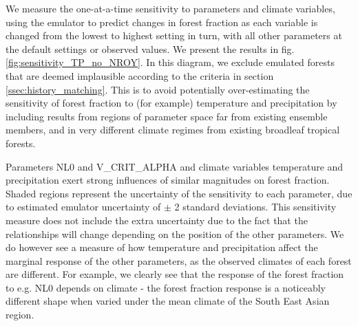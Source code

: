\documentclass[gmd, manuscript]{copernicus}
\begin{document}
We measure the one-at-a-time sensitivity to parameters and climate variables, using the emulator to predict changes in forest fraction as each variable is changed from the lowest to highest setting in turn, with all other parameters at the default settings or observed values. We present the results in fig. \ref{fig:sensitivity_TP_no_NROY}. In this diagram, we exclude emulated forests that are deemed implausible according to the criteria in section \ref{ssec:history_matching}. This is to avoid potentially over-estimating the sensitivity of forest fraction to (for example) temperature and precipitation by including results from regions of parameter space far from existing ensemble members, and in very different climate regimes from existing broadleaf tropical forests. 

 Parameters NL0 and V\_CRIT\_ALPHA and climate variables temperature and precipitation exert strong influences of similar magnitudes on forest fraction. Shaded regions represent the uncertainty of the sensitivity to each parameter, due to estimated emulator uncertainty of $\pm$ 2 standard deviations. This sensitivity measure does not include the extra uncertainty due to the fact that the relationships will change depending on the position of the other parameters. We do however see a measure of how temperature and precipitation affect the marginal response of the other parameters, as the observed climates of each forest are different. For example, we clearly see that the response of the forest fraction to e.g. NL0 depends on climate - the forest fraction response is a noticeably different shape when varied under the mean climate of the South East Asian region.
\end{document}
